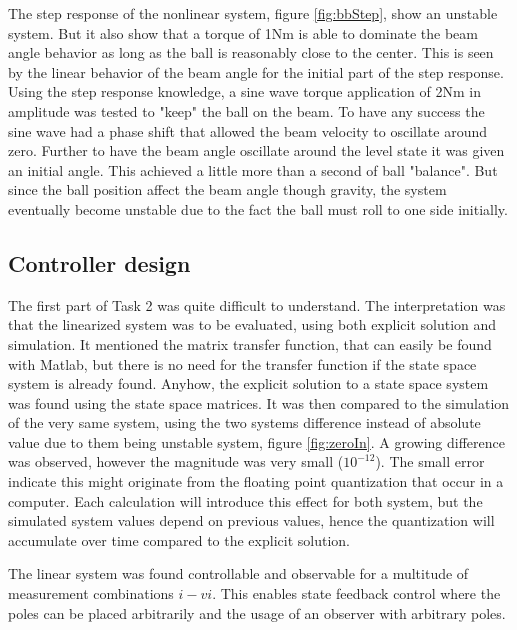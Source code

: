 \documentclass[a4paper, titlepage]{article}
\begin{document}
The step response of the nonlinear system, figure \ref{fig:bbStep}, show an unstable system.
But it also show that a torque of 1Nm is able to dominate the beam angle behavior as long as the ball is reasonably close to the center.
This is seen by the linear behavior of the beam angle for the initial part of the step response.
Using the step response knowledge, a sine wave torque application of 2Nm in amplitude was tested to "keep" the ball on the beam.
To have any success the sine wave had a phase shift that allowed the beam velocity to oscillate around zero.
Further to have the beam angle oscillate around the level state it was given an initial angle.
This achieved a little more than a second of ball "balance".
But since the ball position affect the beam angle though gravity, the system eventually become unstable due to the fact the ball must roll to one side initially. 

\subsection{Controller design}
The first part of Task 2 was quite difficult to understand.
The interpretation was that the linearized system was to be evaluated, using both explicit solution and simulation.
It mentioned the matrix transfer function, that can easily be found with Matlab, but there is no need for the transfer function if the state space system is already found.
Anyhow, the explicit solution to a state space system was found using the state space matrices.
It was then compared to the simulation of the very same system, using the two systems difference instead of absolute value due to them being unstable system, figure \ref{fig:zeroIn}.
A growing difference was observed, however the magnitude was very small ($10^{-12}$).
The small error indicate this might originate from the floating point quantization that occur in a computer.
Each calculation will introduce this effect for both system, but the simulated system values depend on previous values, hence the quantization will accumulate over time compared to the explicit solution.

The linear system was found controllable and observable for a multitude of measurement combinations $i - vi$.
This enables state feedback control where the poles can be placed arbitrarily and the usage of an observer with arbitrary poles.
\end{document}
